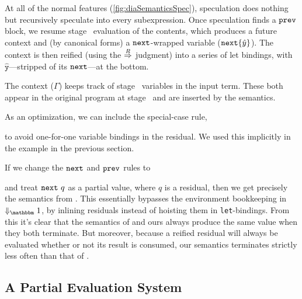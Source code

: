 At all of the normal features (\ref{fig:diaSemanticsSpec}), speculation does nothing but recursively speculate into every subexpression.
Once speculation finds a $\prev$ block, we resume stage \bbone\ evaluation of the contents, which produces a future context and (by canonical forms) a $\next$-wrapped variable ($\next\{\hat y\}$).
The context is then reified (using the $\reifysym$ judgment) into a series of let bindings, with $\mathtt{\hat y}$---stripped of its $\next$---at the bottom.

The context ($\Gamma$) keeps track of stage \bbtwo\ variables in the input term. 
These both appear in the original program at stage \bbtwo\ and are inserted by the semantics.

As an optimization, we can include the special-case rule,
\begin{mathpar}
\end{mathpar}
to avoid one-for-one variable bindings in the residual.
We used this implicitly in the example in the previous section.

If we change the $\next$ and $\prev$ rules to 
and treat $\next~q$ as a partial value, where $q$ is a residual,
then we get precisely the semantics from \cite{davies96}. This essentially bypasses the
environment bookkeeping in $\redonesym$, by inlining residuals instead of
hoisting them in \verb|let|-bindings.
From this it's clear that the semantics of \cite{davies96} and ours always produce the same value when they both terminate.
But moreover, because a reified residual will always be evaluated whether or not its result is consumed, 
our semantics terminates strictly less often than that of \cite{davies96}.

\subsection {A Partial Evaluation System}

